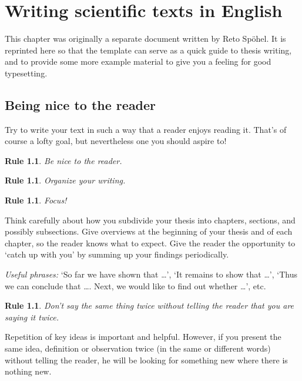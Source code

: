 \chapter{Writing scientific texts in English }

This chapter was originally a separate document written by Reto
Spöhel.  It is reprinted here so that the template can serve as a
quick guide to thesis writing, and to provide some more example
material to give you a feeling for good typesetting.

\theoremstyle{plain}
\theoremsymbol{}
\newtheorem{Rule}[theorem]{Rule}



\section{Being nice to the reader}

Try to write your text in such a way that a reader enjoys reading
it. That's of course a lofty goal, but nevertheless one you should
aspire to!

\begin{Rule}
  Be nice to the reader.
\end{Rule}


\begin{Rule}
  Organize your writing.
\end{Rule}

\begin{Rule}
  Focus!  
\end{Rule}

Think carefully about how you subdivide your thesis into chapters,
sections, and possibly subsections.  Give overviews at the beginning
of your thesis and of each chapter, so the reader knows what to
expect. Give the reader the opportunity to `catch up with you' by
summing up your findings periodically.

\emph{Useful phrases:} `So far we have shown that \ldots', `It remains
to show that \ldots', `Thus we can conclude that
\ldots. Next, we would like to find out whether \ldots', etc.

\begin{Rule}
  Don't say the same thing twice without telling the reader that you
  are saying it twice.
\end{Rule}

Repetition of key ideas is important and helpful. However, if you
present the same idea, definition or observation twice (in the same or
different words) without telling the reader, he will be looking for
something new where there is nothing new.

